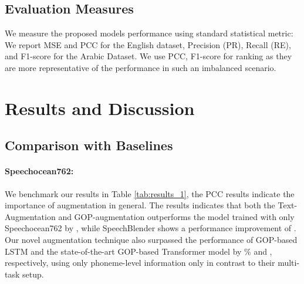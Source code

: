 \documentclass{INTERSPEECH2023}
\begin{document}
\subsection{Evaluation Measures}
We measure the proposed models performance using standard statistical metric: 
We report MSE and PCC for the English dataset, Precision (PR), Recall (RE), and F1-score for the Arabic Dataset. We use PCC, F1-score for ranking as they are more representative of the performance in such an imbalanced scenario. 


\section{Results and Discussion}


\subsection{Comparison with Baselines}
\paragraph*{Speechocean762:} 
We benchmark our results in Table \ref{tab:results_1}, the PCC results indicate the importance of augmentation in general. 
The results indicates that both the Text-Augmentation and GOP-augmentation outperforms the model trained with only Speechocean762 by , while SpeechBlender shows a performance improvement of .
Our novel augmentation technique also surpassed the performance of GOP-based LSTM \cite{JIM} and the
state-of-the-art GOP-based Transformer model \cite{JIM} by \% and , respectively, using only phoneme-level information only in contrast to their multi-task setup. 
\end{document}
